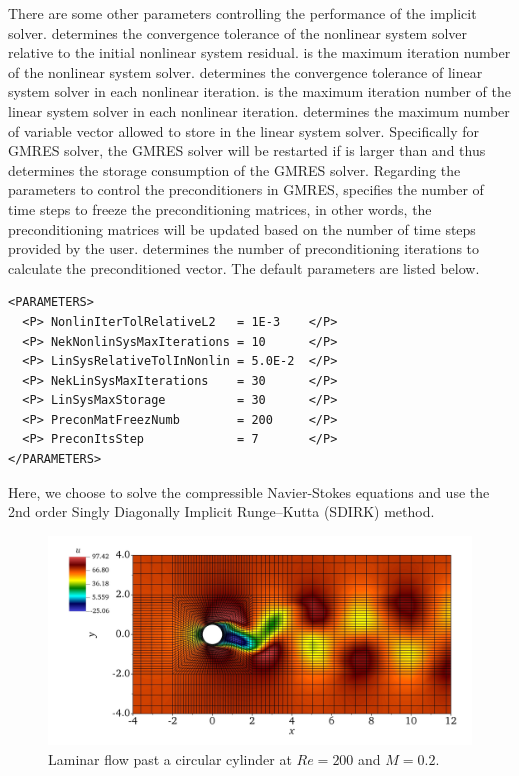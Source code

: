There are some other parameters controlling the performance of the implicit 
solver.  determines the convergence tolerance 
of the nonlinear system solver relative to the initial nonlinear system residual. 
 is the maximum iteration number of the 
nonlinear system solver.  determines the 
convergence tolerance of linear system solver in each nonlinear iteration. 
 is the maximum iteration number of the linear 
system solver in each nonlinear iteration.  determines 
the maximum number of variable vector allowed to store in the linear system 
solver. Specifically for GMRES solver, the GMRES solver will be restarted if 
 is larger than  and thus 
 determines the storage consumption of the GMRES solver. 
Regarding the parameters to control the preconditioners in GMRES, 
 specifies the number of time steps to freeze the 
preconditioning matrices, in other words, the preconditioning matrices will be 
updated based on the number of time steps provided by the user.  
determines the number of preconditioning iterations to calculate the
preconditioned vector. The default parameters are listed below. 

\begin{lstlisting}[style=XmlStyle]
<PARAMETERS>
  <P> NonlinIterTolRelativeL2   = 1E-3    </P>
  <P> NekNonlinSysMaxIterations = 10      </P>
  <P> LinSysRelativeTolInNonlin = 5.0E-2  </P>
  <P> NekLinSysMaxIterations    = 30      </P>
  <P> LinSysMaxStorage          = 30      </P>
  <P> PreconMatFreezNumb        = 200     </P>
  <P> PreconItsStep             = 7       </P>
</PARAMETERS>
\end{lstlisting}


Here, we choose to solve the compressible Navier-Stokes equations and use the 
2nd order Singly Diagonally Implicit Runge–Kutta (SDIRK) method.
\begin{figure}[!htbp]
	\begin{center}
		\centering	
		\includegraphics[scale=0.18,trim=0 0 0 0,clip]{img/CylinderSubsonic.jpeg}
		\caption{Laminar flow past a circular cylinder at $Re=200$ and $M=0.2$.}
		\label{fig:fpcc}
	\end{center}
\end{figure}